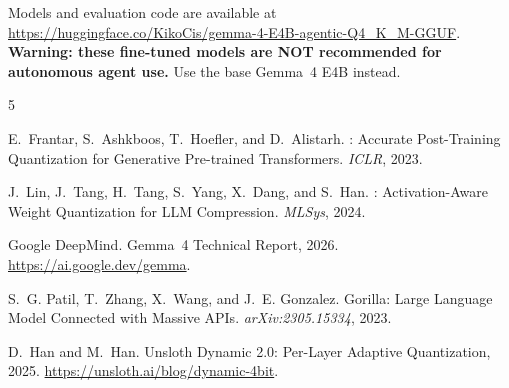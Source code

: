 \documentclass[11pt,a4paper]{article}
\begin{document}
Models and evaluation code are available at \url{https://huggingface.co/KikoCis/gemma-4-E4B-agentic-Q4_K_M-GGUF}. \textbf{Warning: these fine-tuned models are NOT recommended for autonomous agent use.} Use the base Gemma~4 E4B instead.


\begin{thebibliography}{5}

E.~Frantar, S.~Ashkboos, T.~Hoefler, and D.~Alistarh.
: Accurate Post-Training Quantization for Generative Pre-trained Transformers.
\newblock \emph{ICLR}, 2023.

J.~Lin, J.~Tang, H.~Tang, S.~Yang, X.~Dang, and S.~Han.
: Activation-Aware Weight Quantization for {LLM} Compression.
\newblock \emph{MLSys}, 2024.

{Google DeepMind}.
\newblock Gemma~4 Technical Report, 2026.
\newblock \url{https://ai.google.dev/gemma}.

S.~G. Patil, T.~Zhang, X.~Wang, and J.~E. Gonzalez.
\newblock Gorilla: Large Language Model Connected with Massive {APIs}.
\newblock \emph{arXiv:2305.15334}, 2023.

D.~Han and M.~Han.
\newblock Unsloth Dynamic 2.0: Per-Layer Adaptive Quantization, 2025.
\newblock \url{https://unsloth.ai/blog/dynamic-4bit}.

\end{thebibliography}
\end{document}
